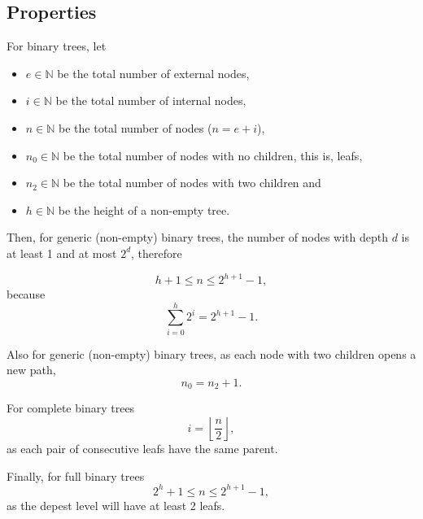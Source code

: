 \subsection{Properties}

For binary trees, let
\begin{itemize}

\item $e \in \mathbb{N}$ be the total number of external nodes,

\item $i \in \mathbb{N}$ be the total number of internal nodes,

\item $n \in \mathbb{N}$ be the total number of nodes ($n = e + i$),

\item $n_0 \in \mathbb{N}$ be the total number of nodes with no children, this
is, leafs,

\item $n_2 \in \mathbb{N}$ be the total number of nodes with two children and

\item $h \in \mathbb{N}$ be the height of a non-empty tree.

\end{itemize}

Then, for generic (non-empty) binary trees, the number of nodes with depth $d$
is at least 1 and at most $2^d$, therefore

\begin{equation}
  h + 1 \le n \le 2^{h+1} - 1,
\end{equation}
because
\begin{equation}
  \sum_{i=0}^{h}2^i = 2^{h+1} - 1.
\end{equation}

Also for generic (non-empty) binary trees, as each node with two children opens
a new path, \begin{equation} n_0 = n_2 + 1.  \end{equation}

For complete binary trees
\begin{equation}
  i = \left \lfloor{\frac{n}{2}}\right \rfloor,
\end{equation}
as each pair of consecutive leafs have the same parent.

Finally, for full binary trees
\begin{equation}
  2^h + 1 \le n \le 2^{h+1} - 1,
\end{equation}
as the depest level will have at least 2 leafs.


